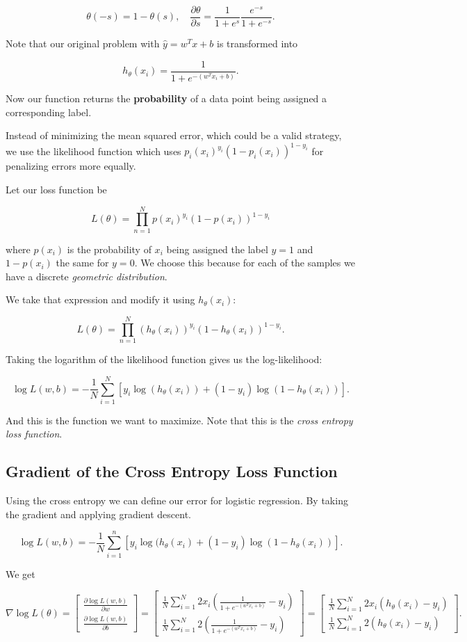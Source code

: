 \[
	\theta(-s) = 1 - \theta(s), \quad \frac{\partial \theta}{\partial s} = \frac{1}{1 + e^s} \frac{e^{-s}}{1 + e^{-s}}.
\]

Note that our original problem with \(\hat{y} = w^Tx + b\) is transformed into

\[
	h_\theta (x_i) = \frac{1}{1 + e^{- (w^T x_i + b)}}.
\]

Now our function returns the \textbf{probability} of a data point being assigned a corresponding label.

Instead of minimizing the mean squared error, which could be a valid strategy, we use the likelihood function which uses
\(p_i(x_i)^{y_i}(1 - p_i(x_i))^{1 - y_i}\) for penalizing errors more equally.

Let our loss function be

\[
	L(\theta) = \prod_{n = 1}^N p(x_i)^{y_i}(1 - p(x_i))^{1 - y_i}
\]

where \(p(x_i)\) is the probability of \(x_i\) being assigned the label \(y = 1\) and \(1 - p(x_i)\) the same for \(y = 0\).
We choose this because for each of the samples we have a discrete \emph{geometric distribution}.

We take that expression and modify it using \(h_{\theta}(x_i)\):

\[
	L(\theta) = \prod_{n = 1}^N (h_\theta(x_i))^{y_i} (1 - h_\theta(x_i))^{1 - y_i}.
\]

Taking the logarithm of the likelihood function gives us the log-likelihood:

\[
	\log L(w,b) = - \frac{1}{N} \sum_{i=1}^{N} [y_i \log(h_\theta (x_i)) + (1 - y_i) \log(1 - h_\theta (x_i))].
\]

And this is the function we want to maximize. Note that this is the \emph{cross entropy loss function}.

\subsection{Gradient of the Cross Entropy Loss Function}

Using the cross entropy we can define our error for logistic regression. By taking the gradient and applying
gradient descent.

\[
	\log L(w,b) = - \frac{1}{N} \sum_{i = 1}^{n} [y_i \log(h_\theta (x_i) + (1 - y_i) \log(1 - h_\theta (x_i))].
\]

We get


\[
	\nabla \log L(\theta) =
	\begin{bmatrix}
		\frac{\partial \log L(w,b)}{\partial w} \\
		\frac{\partial \log L(w,b)}{\partial b}
	\end{bmatrix}
	=
	\begin{bmatrix}
		\frac{1}{N} \sum_{i=1}^{N} 2x_i\left(\frac{1}{1 + e^{- (w^T x_i + b)}}- y_i\right) \\
		\frac{1}{N} \sum_{i=1}^{N} 2\left(\frac{1}{1 + e^{- (w^T x_i + b)}}- y_i\right)
	\end{bmatrix}
	=
	\begin{bmatrix}
		\frac{1}{N} \sum_{i=1}^{N} 2x_i(h_\theta(x_i) - y_i) \\
		\frac{1}{N} \sum_{i=1}^{N} 2(h_\theta(x_i) - y_i)
	\end{bmatrix}.
\]

